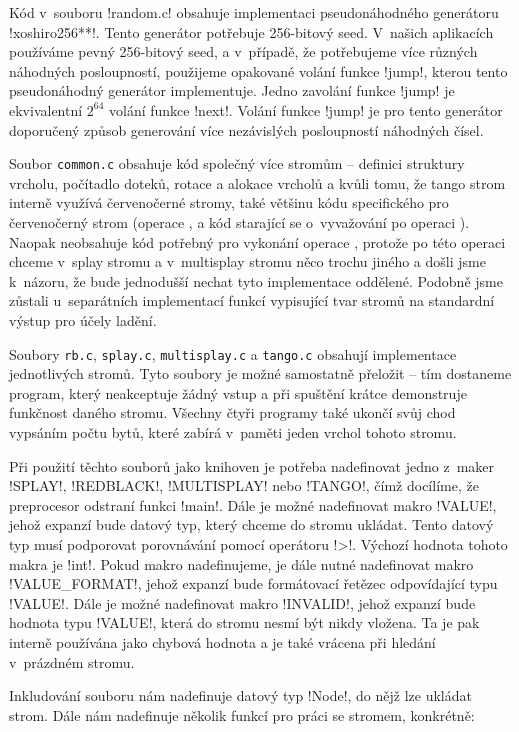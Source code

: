 Kód v~souboru !random.c! obsahuje implementaci pseudonáhodného generátoru
!xoshiro256**!. Tento generátor potřebuje 256-bitový seed. V~našich aplikacích
používáme pevný 256-bitový seed, a v~případě, že potřebujeme více různých
náhodných posloupností, použijeme opakované volání funkce !jump!, kterou tento
pseudonáhodný generátor implementuje. Jedno zavolání funkce !jump! je
ekvivalentní $2^{64}$ volání funkce !next!. Volání funkce !jump! je pro tento
generátor doporučený způsob generování více nezávislých posloupností náhodných
čísel.

Soubor {\tt common.c} obsahuje kód společný více
stromům -- definici struktury vrcholu, počítadlo doteků, rotace a alokace vrcholů a kvůli
tomu, že tango strom interně využívá červenočerné stromy, také většinu kódu
specifického pro červenočerný strom (operace ,  a kód
starající se o~vyvažování po operaci ). Naopak neobsahuje kód
potřebný pro vykonání operace , protože po této operaci chceme
v~splay stromu a v~multisplay stromu něco trochu jiného a došli jsme k~názoru, že
bude jednodušší nechat tyto implementace oddělené. Podobně jsme zůstali
u~separátních implementací funkcí vypisující tvar stromů na standardní výstup pro
účely ladění.

Soubory {\tt rb.c}, {\tt splay.c}, {\tt multisplay.c} a {\tt tango.c} obsahují
implementace jednotlivých stromů. Tyto soubory je možné samostatně přeložit --
tím dostaneme program, který neakceptuje žádný vstup a při spuštění krátce
demonstruje funkčnost daného stromu. Všechny čtyři programy také ukončí svůj
chod vypsáním počtu bytů, které zabírá v~paměti jeden vrchol tohoto stromu.

Při použití těchto souborů jako knihoven je potřeba nadefinovat jedno z~maker
!SPLAY!, !REDBLACK!, !MULTISPLAY! nebo !TANGO!, čímž docílíme, že preprocesor
odstraní funkci !main!. Dále je možné nadefinovat makro !VALUE!, jehož expanzí
bude datový typ, který chceme do stromu ukládat. Tento datový typ musí
podporovat porovnávání pomocí operátoru !>!. Výchozí hodnota tohoto makra je
!int!. Pokud makro nadefinujeme, je dále nutné nadefinovat makro
!VALUE_FORMAT!, jehož expanzí bude formátovací řetězec odpovídající typu
!VALUE!. Dále je možné nadefinovat makro !INVALID!, jehož expanzí bude hodnota
typu !VALUE!, která do stromu nesmí být nikdy vložena. Ta je pak interně
používána jako chybová hodnota a je také vrácena při hledání v~prázdném stromu.

Inkludování souboru nám nadefinuje datový typ !Node!, do nějž lze ukládat strom. Dále nám nadefinuje několik funkcí pro práci se stromem, konkrétně:

